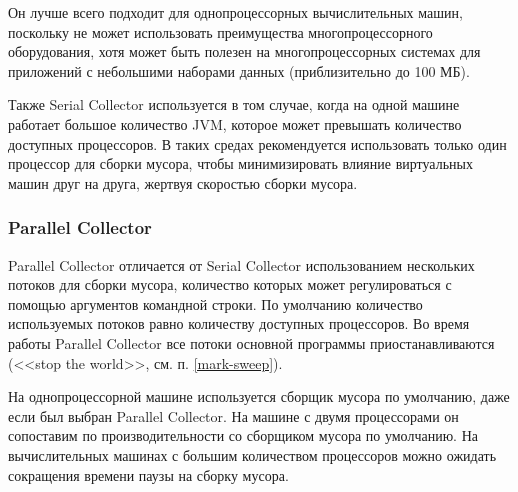 Он лучше всего подходит для однопроцессорных вычислительных машин, поскольку не может использовать преимущества многопроцессорного оборудования, хотя может быть полезен на многопроцессорных системах для приложений с небольшими наборами данных (приблизительно до 100 МБ). \cite{java_21_available_collectors}

Также Serial Collector используется в том случае, когда на одной машине работает большое количество JVM, которое может превышать количество доступных процессоров. В таких средах рекомендуется использовать только один процессор для сборки мусора, чтобы минимизировать влияние виртуальных машин друг на друга, жертвуя скоростью сборки мусора. \cite{java_gc_basics}



\subsubsection{Parallel Collector}

Parallel Collector отличается от Serial Collector использованием нескольких потоков для сборки мусора, количество которых может регулироваться с помощью аргументов командной строки. \cite{java_21_available_collectors} По умолчанию количество используемых потоков равно количеству доступных процессоров. \cite{java_gc_basics}
Во время работы Parallel Collector все потоки основной программы приостанавливаются (<<stop the world>>, см. п. \ref{mark-sweep}). \cite{java_jrockit_memory}

На однопроцессорной машине используется сборщик мусора по умолчанию, даже если был выбран Parallel Collector. На машине с двумя процессорами он сопоставим по производительности со сборщиком мусора по умолчанию. На вычислительных машинах с большим количеством процессоров можно ожидать сокращения времени паузы на сборку мусора. \cite{java_gc_basics}

